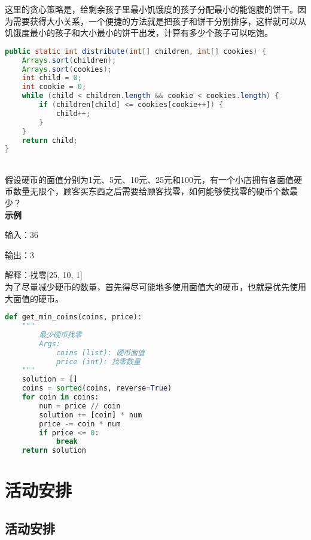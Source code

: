 这里的贪心策略是，给剩余孩子里最小饥饿度的孩子分配最小的能饱腹的饼干。因为需要获得大小关系，一个便捷的方法就是把孩子和饼干分别排序，这样就可以从饥饿度最小的孩子和大小最小的饼干出发，计算有多少个孩子可以吃饱。

\vspace{-0.5cm}

\begin{lstlisting}[language=Java]
public static int distribute(int[] children, int[] cookies) {
    Arrays.sort(children);
    Arrays.sort(cookies);
    int child = 0;
    int cookie = 0;
    while (child < children.length && cookie < cookies.length) {
        if (children[child] <= cookies[cookie++]) {
            child++;
        }
    }
    return child;
}
\end{lstlisting}

\vspace{0.5cm}

 \\

假设硬币的面值分别为1元、5元、10元、25元和100元，有一个小店拥有各面值硬币数量无限个，顾客买东西之后需要给顾客找零，如何能够使找零的硬币个数最少？ \\

\textbf{示例}

输入：36

输出：3

解释：找零[25, 10, 1] \\

为了尽量减少硬币的数量，首先得尽可能地多使用面值大的硬币，也就是优先使用大面值的硬币。

\vspace{-0.5cm}

\begin{lstlisting}[language=Python]
def get_min_coins(coins, price):
    """
        最少硬币找零
        Args:
            coins (list): 硬币面值
            price (int): 找零数量
    """
    solution = []
    coins = sorted(coins, reverse=True)
    for coin in coins:
        num = price // coin
        solution += [coin] * num
        price -= coin * num
        if price <= 0:
            break
    return solution
\end{lstlisting}

\newpage

\section{活动安排}

\subsection{活动安排}

